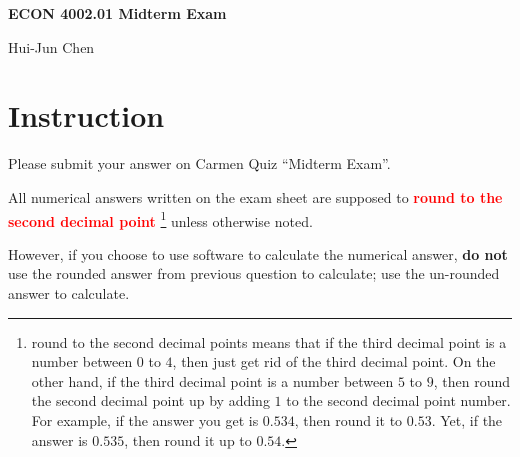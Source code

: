 \documentclass[14pt]{extarticle}
\newcommand{\red}[1]{\textcolor{red}{#1}}
\newcommand{\showAns}{\setboolean{showAns}{true}}
\begin{document}
\centerline{\huge\bf ECON 4002.01 Midterm Exam}
\smallskip
\centerline{\LARGE Hui-Jun Chen}

\medskip

\showAns

\section*{Instruction}
\label{sec:Instruction}
Please submit your answer on Carmen Quiz ``Midterm Exam''.

All numerical answers written on the exam sheet are supposed to \red{\textbf{round to the second decimal point}}%
\footnote{round to the second decimal points means that if the third decimal point is a number between $ 0 $ to $ 4 $, then just get rid of the third decimal point. On the other hand, if the third decimal point is a number between $ 5 $ to $ 9 $, then round the second decimal point up by adding $ 1 $ to the second decimal point number. For example, if the answer you get is $ 0.534 $, then round it to $ 0.53 $. Yet, if the answer is $ 0.535 $, then round it up to $ 0.54 $.}
unless otherwise noted.

However, if you choose to use software to calculate the numerical answer, \textbf{do not} use the rounded answer from previous question to calculate; use the un-rounded answer to calculate.


\end{document}
